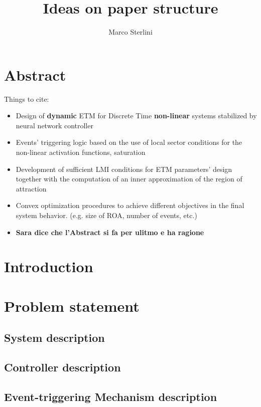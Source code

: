 \documentclass{article}
\begin{document}
\date{}
\author{Marco Sterlini}

\title{Ideas on paper structure}
\maketitle

\section{\textbf{Abstract}}
Things to cite:
\begin{itemize}
  \item Design of \textbf{dynamic} ETM for Discrete Time \textbf{non-linear} systems stabilized by neural network controller
  \item Events' triggering logic based on the use of local sector conditions for the non-linear activation functions, saturation
  \item Development of sufficient LMI conditions for ETM parameters' design together with the computation of an inner approximation of the region of attraction
  \item Convex optimization procedures to achieve different objectives in the final system behavior. (e.g. size of ROA, number of events, etc.)
  \item \textbf{Sara dice che l'Abstract si fa per ulitmo e ha ragione}
\end{itemize}

\section{Introduction}

\section{Problem statement}
\subsection{System description}
\subsection{Controller description}
\subsection{Event-triggering Mechanism description}


\section{}

\end{document}
